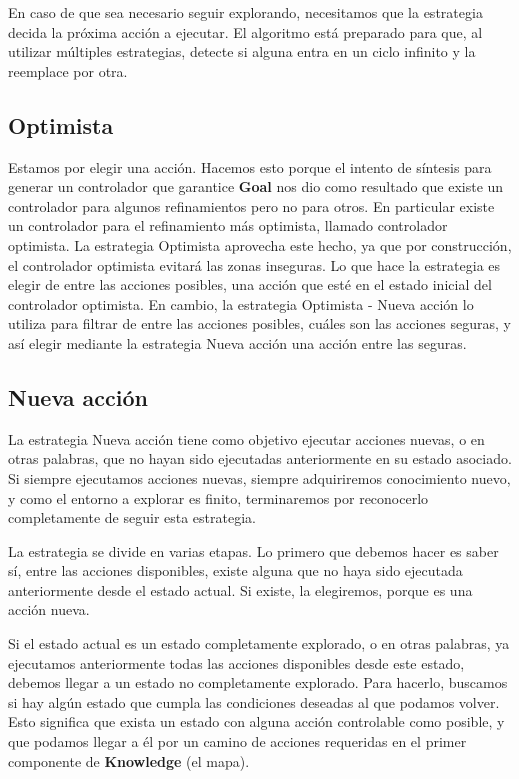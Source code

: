 En caso de que sea necesario seguir explorando, necesitamos que la estrategia decida la próxima acción a ejecutar. El algoritmo está preparado para que, 
al utilizar múltiples estrategias, detecte si alguna entra en un ciclo infinito y la reemplace por otra.

\subsection{Optimista}

Estamos por elegir una acción. Hacemos esto porque el intento de síntesis para generar un controlador que garantice \textbf{Goal} nos dio como resultado que 
existe un controlador para algunos refinamientos pero no para otros. En particular existe un controlador para el refinamiento más optimista, llamado 
controlador optimista. La estrategia Optimista aprovecha este hecho, ya que por construcción, el controlador optimista evitará las zonas inseguras. Lo que 
hace la estrategia es elegir de entre las acciones posibles, una acción que esté en el estado inicial del controlador optimista. En cambio, la estrategia 
Optimista - Nueva acción lo utiliza para filtrar de entre las acciones posibles, cuáles son las acciones seguras, y así elegir mediante la estrategia Nueva acción 
una acción entre las seguras.

\subsection{Nueva acción}

La estrategia Nueva acción tiene como objetivo ejecutar acciones nuevas, o en otras palabras, que no hayan sido ejecutadas anteriormente en su estado asociado. 
Si siempre ejecutamos acciones nuevas, siempre adquiriremos conocimiento nuevo, y como el entorno a explorar es finito, terminaremos por reconocerlo completamente 
de seguir esta estrategia.


La estrategia se divide en varias etapas. Lo primero que debemos hacer es saber sí, entre las acciones disponibles, existe alguna que no haya sido ejecutada 
anteriormente desde el estado actual. Si existe, la elegiremos, porque es una acción nueva.


Si el estado actual es un estado completamente explorado, o en otras palabras, ya ejecutamos anteriormente todas las acciones disponibles desde este estado, debemos 
llegar a un estado no completamente explorado. Para hacerlo, buscamos si hay algún estado que cumpla las condiciones deseadas al que podamos volver. Esto 
significa que exista un estado con alguna acción controlable como posible, y que podamos llegar a él por un camino de acciones requeridas en el primer componente 
de \textbf{Knowledge} (el mapa).


